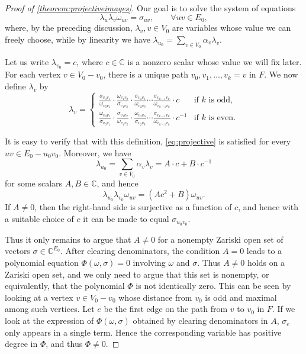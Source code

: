 \documentclass[11pt,a4paper,dvipsnames]{scrartcl}
\theoremstyle{definition}
\newcommand{\CC}{\mathbb{C}}
\begin{document}
\begin{proof}[Proof of \cref{theorem:projectiveimages}]
    Our goal is to solve the system of equations
    \begin{equation}\label{eq:projective}
        \lambda_u \lambda_v \omega_{uv} = \sigma_{uv}, \hspace{2em} \forall uv \in E_0,
    \end{equation}
    where, by the preceding discussion, $\lambda_v, v \in V_0$ are variables whose value we can freely choose, while by linearity we have $\lambda_{u_0} = \sum_{v \in V_0} \alpha_v \lambda_v$.

    Let us write $\lambda_{v_0} = c$, where $c \in \CC$ is a nonzero scalar whose value we will fix later. For each vertex $v \in V_0 - v_0$, there is a unique path $v_0, v_1, \ldots, v_k = v$ in $F$. We now define $\lambda_v$ by
    \[\lambda_v = 
    \begin{cases}
    \frac{\sigma_{v_0v_1}}{\omega_{v_0v_1}} \cdot \frac{\omega_{v_1v_2}}{\sigma_{v_1v_2}} \cdot \frac{\sigma_{v_2v_3}}{\omega_{v_2v_3}} \cdots \frac{\sigma_{v_{k-1}v_k}}{\omega_{v_{k-1}v_k}} \cdot c  &\text{if } k \text{ is odd,}  \\ \frac{\omega_{v_0v_1}}{\sigma_{v_0v_1}} \cdot \frac{\sigma_{v_1v_2}}{\omega_{v_1v_2}} \cdot \frac{\omega_{v_2v_3}}{\sigma_{v_2v_3}} \cdots \frac{\sigma_{v_{k-1}v_k}}{\omega_{v_{k-1}v_k}} \cdot c^{-1} &\text{if } k \text{ is even.}
    \end{cases}\]

    It is easy to verify that with this definition, \cref{eq:projective} is satisfied for every $uv \in E_0 - u_0v_0$. Moreover, we have \[\lambda_{u_0} = \sum_{v \in V_0}\alpha_v \lambda_v = A \cdot c + B \cdot c^{-1}\] for some scalars $A,B \in \CC$, and hence \[\lambda_{u_0}\lambda_{v_0}\omega_{uv} = (Ac^2 + B) \omega_{uv}.\] If $A \neq 0$, then the right-hand side is surjective as a function of $c$, and hence with a suitable choice of $c$ it can be made to equal $\sigma_{u_0v_0}$. 
    
    Thus it only remains to argue that $A \neq 0$ for a nonempty Zariski open set of vectors $\sigma \in \CC^{E_0}$. After clearing denominators, the condition $A = 0$ leads to a polynomial equation $\Phi(\omega,\sigma) = 0$ involving $\omega$ and $\sigma$. Thus $A \neq 0$ holds on a Zariski open set, and we only need to argue that this set is nonempty, or equivalently, that the polynomial $\Phi$ is not identically zero. This can be seen by looking at a vertex $v \in V_0 - v_0$ whose distance from $v_0$ is odd and maximal among such vertices. Let $e$ be the first edge on the path from $v$ to $v_0$ in $F$. If we look at the expression of $\Phi(\omega,\sigma)$ obtained by clearing denominators in $A$, $\sigma_e$ only appears in a single term. Hence the corresponding variable has positive degree in $\Phi$, and thus $\Phi \neq 0$.
\end{proof}
\end{document}
